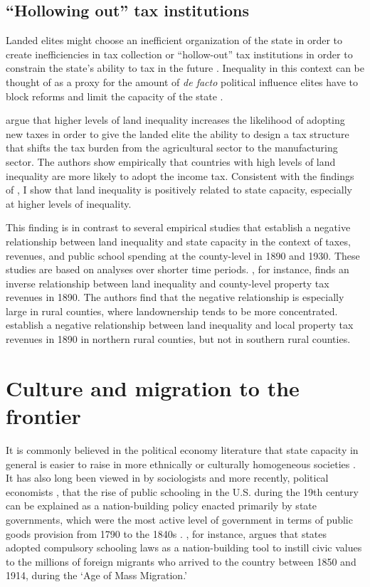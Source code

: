 \subsection{``Hollowing out'' tax institutions}
	
Landed elites might choose an inefficient organization of the state in order to create inefficiencies in tax collection \citep{acemoglu2011emergence} or ``hollow-out'' tax institutions in order to constrain the state's ability to tax in the future \citep{suryanarayan2017hollowing}. Inequality in this context can be thought of as a proxy for the amount of \emph{de facto} political influence elites have to block reforms and limit the capacity of the state \citep{acemoglu2008persistence}.

\citet{mares2015non} argue that higher levels of land inequality increases the likelihood of adopting new taxes in order to give the landed elite the ability to design a tax structure that shifts the tax burden from the agricultural sector to the manufacturing sector. The authors show empirically that countries with high levels of land inequality are more likely to adopt the income tax.  Consistent with the findings of \citet{mares2015non}, I show that land inequality is positively related to state capacity, especially at higher levels of inequality. 

This finding is in contrast to several empirical studies that establish a negative relationship between land inequality and state capacity in the context of taxes, revenues, and public school spending at the county-level in 1890 and 1930. These studies are based on analyses over shorter time periods. \citet{ramcharan2010inequality}, for instance, finds an inverse relationship between land inequality and county-level property tax revenues in 1890. The authors find that the negative relationship is especially large in rural counties, where landownership tends to be more concentrated. \citet{vollrath2013inequality} establish a negative relationship between land inequality and local property tax revenues in 1890 in northern rural counties, but not in southern rural counties. 

\section{Culture and migration to the frontier}

It is commonly believed in the political economy literature that state capacity in general is easier to raise in more ethnically or culturally homogeneous societies \citep{besley2010state}. It has also long been viewed in by sociologists \citep{meyer1979public} and more recently, political economists \citep{alesina2013nation,bandiera2018nation}, that the rise of public schooling in the U.S. during the 19th century can be explained as a nation-building policy enacted primarily by state governments, which were the most active level of government in terms of public goods provision from 1790 to the 1840s \citep{wallis2000american}. \citet{bandiera2018nation}, for instance, argues that states adopted compulsory schooling laws as a nation-building tool to instill civic values to the millions of foreign migrants who arrived to the country between 1850 and 1914, during the `Age of Mass Migration.' 

